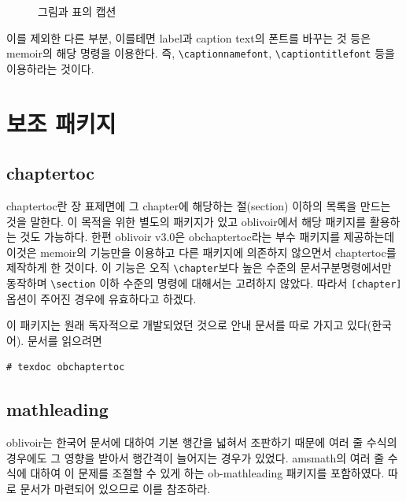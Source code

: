 \documentclass[
	12pt,
	a4paper,
	kosection,
	footnote,
	nobookmarks,
	microtype,
	figtabcapt,
]{oblivoir}
\begin{document}
\begin{figure}[h]
\caption{그림과 표의 캡션}
\end{figure}

이를 제외한 다른 부분, 이를테면 label과 caption text의 폰트를 바꾸는 것 등은 memoir의
해당 명령을 이용한다. 즉, \verb|\captionnamefont|, \verb|\captiontitlefont| 등을 이용하라는 것이다.

\section{보조 패키지}

\subsection{chaptertoc}

chaptertoc란 장 표제면에 그 chapter에 해당하는 절(section) 이하의 목록을
만드는 것을 말한다. 이 목적을 위한 별도의 패키지가 있고 oblivoir에서 해당 패키지를
활용하는 것도 가능하다. 한편 oblivoir v3.0은 \textsf{obchaptertoc}라는 부수
패키지를 제공하는데 이것은 \textsf{memoir}의 기능만을 이용하고 다른 패키지에
의존하지 않으면서 chaptertoc를 제작하게 한 것이다.
이 기능은 오직 \verb|\chapter|보다 높은 수준의 문서구분명령에서만 동작하며
\verb|\section| 이하 수준의 명령에 대해서는 고려하지 않았다. 따라서 \verb|[chapter]| 옵션이
주어진 경우에 유효하다고 하겠다.

\begin{boxedverbatim}
\usepackage{obchaptertoc}
\chaptertoc
\end{boxedverbatim}

이 패키지는 원래 독자적으로 개발되었던 것으로 안내 문서를 따로 가지고 있다(한국어).
문서를 읽으려면
\begin{verbatim}
# texdoc obchaptertoc
\end{verbatim}

\subsection{mathleading}

oblivoir는 한국어 문서에 대하여 기본 행간을 넓혀서 조판하기 때문에 여러 줄 수식의 경우에도
그 영향을 받아서 행간격이 늘어지는 경우가 있었다.
\textsf{amsmath}의 여러 줄 수식에 대하여 이 문제를 조절할 수 있게 하는 \textsf{ob-mathleading}
패키지를 포함하였다. 따로 문서가 마련되어 있으므로 이를 참조하라.
\end{document}
